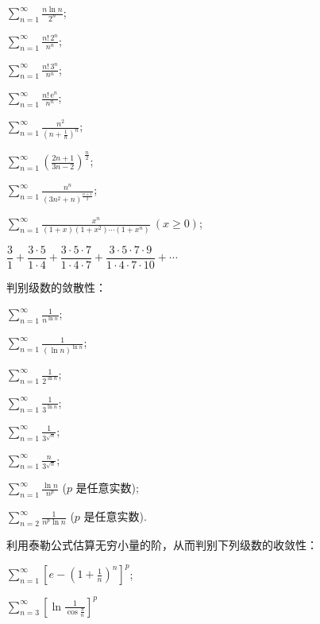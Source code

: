 \begin{xiti}
\begin{ziti}
\item $\displaystyle\sum_{n=1}^{\infty}\frac{n\ln n}{2^{n}}$;
\item $\displaystyle\sum_{n=1}^{\infty}\frac{n!\,2^{n}}{n^{n}}$;
\item $\displaystyle\sum_{n=1}^{\infty}\frac{n!\,3^{n}}{n^{n}}$;
\item $\displaystyle\sum_{n=1}^{\infty}\frac{n!\,\mathrm{e}^{n}}{n^{n}}$;
\item $\displaystyle\sum_{n=1}^{\infty}\frac{n^{2}}{\left(n+\frac{1}{n}\right)^{n}}$;
\item $\displaystyle\sum_{n=1}^{\infty}\left(\frac{2n+1}{3n-2}\right)^{\frac{n}{2}}$;
\item $\displaystyle\sum_{n=1}^{\infty}\frac{n^{n}}{\left(3n^{2}+n\right)^{\frac{n+1}{2}}}$;
\item $\displaystyle\sum_{n=1}^{\infty}\frac{x^{n}}{(1+x)(1+x^{2})\cdots(1+x^{n})}\ (x\geqslant0)$;
\item $\dfrac{3}{1}+\dfrac{3\cdot5}{1\cdot4}+\dfrac{3\cdot5\cdot7}{1\cdot4\cdot7}+\dfrac{3\cdot5\cdot7\cdot9}{1\cdot4\cdot7\cdot10}+\cdots$
\end{ziti}
\item 判别级数的敛散性：
\begin{ziti}
\item $\displaystyle\sum_{n=1}^{\infty}\frac{1}{n^{\ln n}}$;
\item $\displaystyle\sum_{n=1}^{\infty}\frac{1}{(\ln n)^{\ln n}}$;
\item $\displaystyle\sum_{n=1}^{\infty}\frac{1}{2^{\ln n}}$;
\item $\displaystyle\sum_{n=1}^{\infty}\frac{1}{3^{\ln n}}$;
\item $\displaystyle\sum_{n=1}^{\infty}\frac{1}{3^{\sqrt{n}}}$;
\item $\displaystyle\sum_{n=1}^{\infty}\frac{n}{3^{\sqrt{n}}}$;
\item $\displaystyle\sum_{n=1}^{\infty}\frac{\ln n}{n^{p}}$ ($p$ 是任意实数);
\item $\displaystyle\sum_{n=2}^{\infty}\frac{1}{n^{p}\ln n}$ ($p$ 是任意实数).
\end{ziti}
\item 利用泰勒公式估算无穷小量的阶，从而判别下列级数的收敛性：
\begin{ziti}
\item $\displaystyle\sum_{n=1}^{\infty}\left[e-\left(1+\frac{1}{n}\right)^{n}\right]^{p}$;
\item $\displaystyle\sum_{n=3}^{\infty}\left[\ln\frac{1}{\cos\frac{\pi}{n}}\right]^p$

\end{ziti}
\end{xiti}
